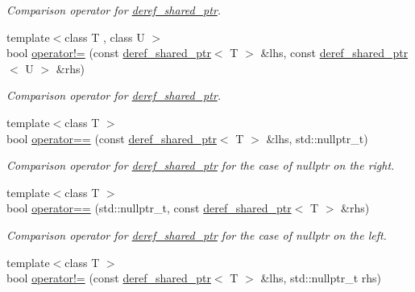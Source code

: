 \begin{DoxyCompactItemize}
\begin{DoxyCompactList}\small\item\em Comparison operator for \hyperlink{classslb_1_1core_1_1util_1_1deref__shared__ptr}{deref\+\_\+shared\+\_\+ptr}. \end{DoxyCompactList}\item 
{\footnotesize template$<$class T , class U $>$ }\\bool \hyperlink{namespaceslb_1_1core_1_1util_a6a344fb210c4db8ba8a67de43ed8ea35}{operator!=} (const \hyperlink{classslb_1_1core_1_1util_1_1deref__shared__ptr}{deref\+\_\+shared\+\_\+ptr}$<$ T $>$ \&lhs, const \hyperlink{classslb_1_1core_1_1util_1_1deref__shared__ptr}{deref\+\_\+shared\+\_\+ptr}$<$ U $>$ \&rhs)
\begin{DoxyCompactList}\small\item\em Comparison operator for \hyperlink{classslb_1_1core_1_1util_1_1deref__shared__ptr}{deref\+\_\+shared\+\_\+ptr}. \end{DoxyCompactList}\item 
{\footnotesize template$<$class T $>$ }\\bool \hyperlink{namespaceslb_1_1core_1_1util_a4e0953eb5fd3073c0057f7de724c0f91}{operator==} (const \hyperlink{classslb_1_1core_1_1util_1_1deref__shared__ptr}{deref\+\_\+shared\+\_\+ptr}$<$ T $>$ \&lhs, std\+::nullptr\+\_\+t)
\begin{DoxyCompactList}\small\item\em Comparison operator for \hyperlink{classslb_1_1core_1_1util_1_1deref__shared__ptr}{deref\+\_\+shared\+\_\+ptr} for the case of {\ttfamily nullptr} on the right. \end{DoxyCompactList}\item 
{\footnotesize template$<$class T $>$ }\\bool \hyperlink{namespaceslb_1_1core_1_1util_a8e196a0adbb3f886af645dc3bcc0c8f8}{operator==} (std\+::nullptr\+\_\+t, const \hyperlink{classslb_1_1core_1_1util_1_1deref__shared__ptr}{deref\+\_\+shared\+\_\+ptr}$<$ T $>$ \&rhs)
\begin{DoxyCompactList}\small\item\em Comparison operator for \hyperlink{classslb_1_1core_1_1util_1_1deref__shared__ptr}{deref\+\_\+shared\+\_\+ptr} for the case of {\ttfamily nullptr} on the left. \end{DoxyCompactList}\item 
{\footnotesize template$<$class T $>$ }\\bool \hyperlink{namespaceslb_1_1core_1_1util_a08e1702769bfbe3411dad3f0a68f526a}{operator!=} (const \hyperlink{classslb_1_1core_1_1util_1_1deref__shared__ptr}{deref\+\_\+shared\+\_\+ptr}$<$ T $>$ \&lhs, std\+::nullptr\+\_\+t rhs)

\end{DoxyCompactItemize}
